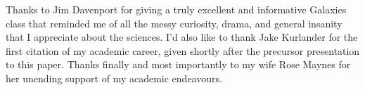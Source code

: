 \documentclass[twocolumn]{aastex631}
\begin{document}
\begin{acknowledgements}
Thanks to Jim Davenport for giving a truly excellent and informative Galaxies class that reminded me of all the messy curiosity, drama, and general insanity that I appreciate about the sciences. I'd also like to thank Jake Kurlander for the first citation of my academic career, given shortly after the precursor presentation to this paper. Thanks finally and most importantly to my wife Rose Maynes for her unending support of my academic endeavours.
\end{acknowledgements}



{}



\end{document}

